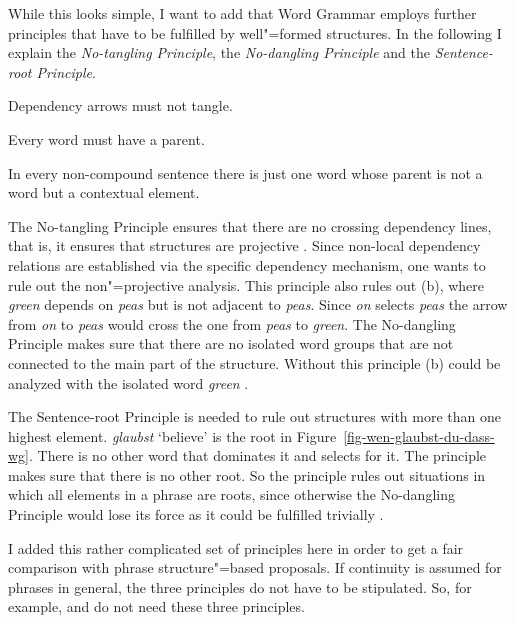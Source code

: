 While this looks simple, I want to add that Word Grammar employs further principles that have to be
fulfilled by well"=formed  structures. In the following I explain the \emph{No-tangling Principle},
the \emph{No-dangling Principle} and the \emph{Sentence-root Principle}.
\begin{principle}
  Dependency arrows must not tangle.
\end{principle}

\begin{principle}
Every word must have a parent.
\end{principle}

\begin{principle}
In every non-compound sentence there is just one word whose parent
is not a word but a contextual element.
\end{principle}

\largerpage
\noindent
The No-tangling Principle ensures that there are no crossing dependency lines, that is, it ensures
that structures are projective \citep[]{Hudson2000a}. Since non-local dependency relations are established via the
specific dependency mechanism, one wants to rule out the non"=projective analysis. This principle
also rules out (b), where \emph{green} depends on \emph{peas} but is not adjacent to
\emph{peas}. Since \emph{on} selects \emph{peas} the arrow from \emph{on} to \emph{peas} would cross
the one from \emph{peas} to \emph{green}.
\eal
{}
\zl
The No-dangling Principle makes sure that there are no isolated word groups that are not connected to the main part
of the structure. Without this principle (b) could be analyzed with the isolated word
\emph{green} \citep[]{Hudson2000a}.

The Sentence-root Principle is needed to rule out structures with more than one highest
element. \emph{glaubst} `believe' is the root in Figure~\ref{fig-wen-glaubst-du-dass-wg}. There is
no other word that dominates it and selects for it. The principle makes sure that there is no other
root. So the principle rules out situations in which all elements in a phrase are roots, since
otherwise the No-dangling Principle would lose its force as it could be fulfilled trivially \citep[]{Hudson2000a}.

I added this rather complicated set of principles here in order to get a fair
comparison with phrase structure"=based proposals. If continuity is assumed for phrases in general,
the three principles do not have to be stipulated. So, for example, \lfg and \hpsg
do not need these three principles.

